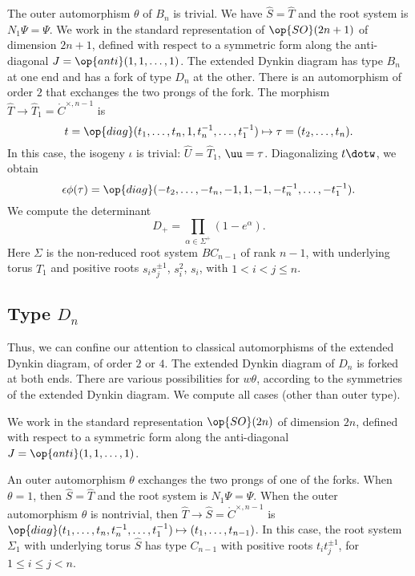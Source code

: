The outer automorphism $\theta$ of $B_n$ is trivial.  We have $\hat S
= \hat T$ and the root system is $N_1\Psi =\Psi$.  We work in the
standard representation of $\op{SO}(2n+1)$ of dimension $2n+1$,
defined with respect to a symmetric form along the anti-diagonal $J =
\op{anti}(1,1,\ldots,1)$.  The extended Dynkin diagram has type $B_n$
at one end and has a fork of type $D_n$ at the other.  There is an
automorphism of order $2$ that exchanges the two prongs of the fork.
The morphism $\hat T\to \hat T_1=\ring{C}^{\times,n-1}$ is
\[
t = \op{diag}(t_1,\ldots,t_n,1,t_n^{-1},\ldots,t_1^{-1})
\mapsto \tau = (t_2,\ldots,t_n).
\]
In this case, the isogeny $\iota$ is trivial: $\hat U= \hat T_1$,
$\uu=\tau$.  Diagonalizing $t\dotw$, we obtain
\begin{equation}
\epsilon\phi(\tau) 
= \op{diag}(-t_2,\ldots,-t_n,-1,1,-1,-t_n^{-1},\ldots,-t_1^{-1}).
\end{equation}
We compute the determinant
\begin{equation}
D_+ = \prod_{\alpha\in \Sigma^+} (1-e^\alpha).
\end{equation}
Here $\Sigma$ is the non-reduced root system $BC_{n-1}$ of rank $n-1$,
with underlying torus $\hat T_1$ and positive roots $s_i s_j^{\pm 1}$,
$s_i^2$, $s_i$, with $1<i<j\le n$.

\subsection{Type $D_n$}\label{sec:dn}

Thus, we can confine our attention to classical automorphisms of the
extended Dynkin diagram, of order $2$ or $4$.  The extended Dynkin
diagram of $D_n$ is forked at both ends.  There are various
possibilities for $w\theta$, according to the symmetries of the
extended Dynkin diagram.  We compute all cases (other than outer
type).

We work in the standard representation $\op{SO}(2n)$ of dimension
$2n$, defined with respect to a symmetric form along the anti-diagonal
$J = \op{anti}(1,1,\ldots,1)$.

An outer automorphism $\theta$ exchanges the two prongs of one of the
forks.  When $\theta=1$, then $\hat S = \hat T$ and the root system is
$N_1\Psi = \Psi$.  When the outer automorphism $\theta$ is nontrivial,
then $\hat T\to \hat S =\ring{C}^{\times,n-1}$ is
$\op{diag}(t_1,\ldots,t_n,t_n^{-1},\ldots,t_1^{-1})\mapsto
(t_1,\ldots,t_{n-1})$.  In this case, the root system $\Sigma_1$ with
underlying torus $\hat S$ has type $C_{n-1}$ with positive roots $t_i
t_j^{\pm 1}$, for $1\le i\le j<n$.


